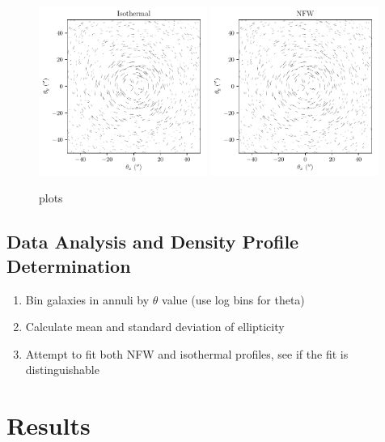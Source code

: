 \documentclass[10pt]{article}
\begin{document}
\begin{figure}
    \centering
    \includegraphics[width=0.49\textwidth]{isothermalellipticities.pdf}
    \includegraphics[width=0.49\textwidth]{nfwellipticities.pdf}
    \caption{plots}
    \label{}
\end{figure}


\subsection{Data Analysis and Density Profile Determination}
\begin{enumerate}
\item Bin galaxies in annuli by $\theta$ value (use log bins for theta)
\item Calculate mean and standard deviation of ellipticity
\item Attempt to fit both NFW and isothermal profiles, see if the fit is distinguishable
\end{enumerate}



\section{Results}
\end{document}
